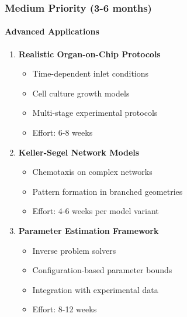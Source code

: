 \subsubsection{Medium Priority (3-6 months)}

\paragraph{Advanced Applications}
\begin{enumerate}
    \item \textbf{Realistic Organ-on-Chip Protocols}
    \begin{itemize}
        \item Time-dependent inlet conditions
        \item Cell culture growth models
        \item Multi-stage experimental protocols
        \item Effort: 6-8 weeks
    \end{itemize}
    
    \item \textbf{Keller-Segel Network Models}
    \begin{itemize}
        \item Chemotaxis on complex networks
        \item Pattern formation in branched geometries
        \item Effort: 4-6 weeks per model variant
    \end{itemize}
    
    \item \textbf{Parameter Estimation Framework}
    \begin{itemize}
        \item Inverse problem solvers
        \item Configuration-based parameter bounds
        \item Integration with experimental data
        \item Effort: 8-12 weeks
    \end{itemize}
\end{enumerate}

